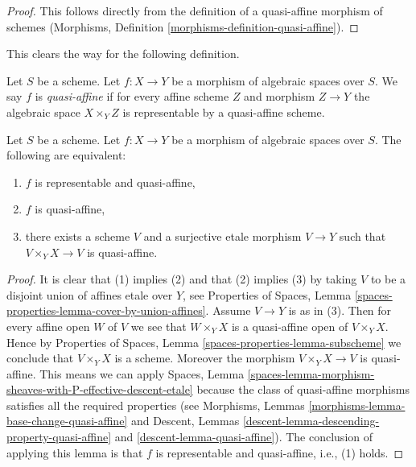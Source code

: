 \begin{proof}
This follows directly from the definition of a quasi-affine morphism
of schemes
(Morphisms, Definition \ref{morphisms-definition-quasi-affine}).
\end{proof}

\noindent
This clears the way for the following definition.

\begin{definition}
\label{definition-quasi-affine}
Let $S$ be a scheme.
Let $f : X \to Y$ be a morphism of algebraic spaces over $S$.
We say $f$ is {\it quasi-affine} if for every affine scheme $Z$ and
morphism $Z \to Y$ the algebraic space $X \times_Y Z$ is representable
by a quasi-affine scheme.
\end{definition}

\begin{lemma}
\label{lemma-quasi-affine-local}
Let $S$ be a scheme.
Let $f : X \to Y$ be a morphism of algebraic spaces over $S$.
The following are equivalent:
\begin{enumerate}
\item $f$ is representable and quasi-affine,
\item $f$ is quasi-affine,
\item there exists a scheme $V$ and a surjective etale morphism
$V \to Y$ such that $V \times_Y X \to V$ is quasi-affine.
\end{enumerate}
\end{lemma}

\begin{proof}
It is clear that (1) implies (2) and that (2) implies (3) by taking
$V$ to be a disjoint union of affines etale over $Y$, see
Properties of Spaces,
Lemma \ref{spaces-properties-lemma-cover-by-union-affines}.
Assume $V \to Y$ is as in (3). Then for every affine open $W$ of $V$ we see
that $W \times_Y X$ is a quasi-affine open of $V \times_Y X$. Hence by
Properties of Spaces, Lemma \ref{spaces-properties-lemma-subscheme}
we conclude that $V \times_Y X$ is a scheme. Moreover the morphism
$V \times_Y X \to V$ is quasi-affine. This means we can apply
Spaces,
Lemma \ref{spaces-lemma-morphism-sheaves-with-P-effective-descent-etale}
because the class of quasi-affine morphisms satisfies all the required
properties (see
Morphisms, Lemmas \ref{morphisms-lemma-base-change-quasi-affine} and
Descent, Lemmas \ref{descent-lemma-descending-property-quasi-affine}
and \ref{descent-lemma-quasi-affine}). The conclusion of applying this lemma
is that $f$ is representable and quasi-affine, i.e., (1) holds.
\end{proof}

